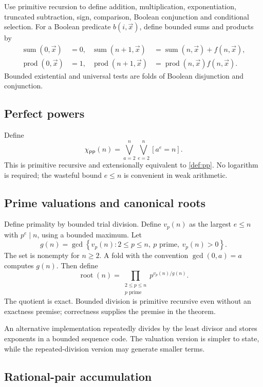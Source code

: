 \documentclass[11pt]{article}
\theoremstyle{definition}
\newcommand{\PP}{\mathsf{PP}}
\newcommand{\set}[1]{\left\{#1\right\}}
\begin{document}
Use primitive recursion to define addition, multiplication, exponentiation,
truncated subtraction, sign, comparison, Boolean conjunction and conditional
selection.  For a Boolean predicate $b(i,\vec x)$, define bounded sums and
products by
\[
\begin{aligned}
 \operatorname{sum}(0,\vec x)&=0,
 &\operatorname{sum}(n+1,\vec x)&=\operatorname{sum}(n,\vec x)+f(n,\vec x),\\
 \operatorname{prod}(0,\vec x)&=1,
 &\operatorname{prod}(n+1,\vec x)&=\operatorname{prod}(n,\vec x)f(n,\vec x).
\end{aligned}
\]
Bounded existential and universal tests are folds of Boolean disjunction and
conjunction.

\subsection{Perfect powers}

Define
\[
 \chi_{\PP}(n)=
 \bigvee_{a=2}^{n}\bigvee_{e=2}^{n}[a^e=n].
\]
This is primitive recursive and extensionally equivalent to
\cref{def:pp}.  No logarithm is required; the wasteful bound $e\le n$ is
convenient in weak arithmetic.

\subsection{Prime valuations and canonical roots}

Define primality by bounded trial division.  Define $v_p(n)$ as the largest
$e\le n$ with $p^e\mid n$, using a bounded maximum.  Let
\[
  g(n)=\gcd\set{v_p(n):2\le p\le n,\ p\text{ prime},\ v_p(n)>0}.
\]
The set is nonempty for $n\ge2$.  A fold with the convention
$\gcd(0,a)=a$ computes $g(n)$.  Then define
\[
  \operatorname{root}(n)=
  \prod_{\substack{2\le p\le n\\p\text{ prime}}}
  p^{v_p(n)/g(n)}.
\]
The quotient is exact.  Bounded division is primitive recursive even without
an exactness premise; correctness supplies the premise in the theorem.

An alternative implementation repeatedly divides by the least divisor and
stores exponents in a bounded sequence code.  The valuation version is simpler
to state, while the repeated-division version may generate smaller terms.

\subsection{Rational-pair accumulation}
\end{document}
